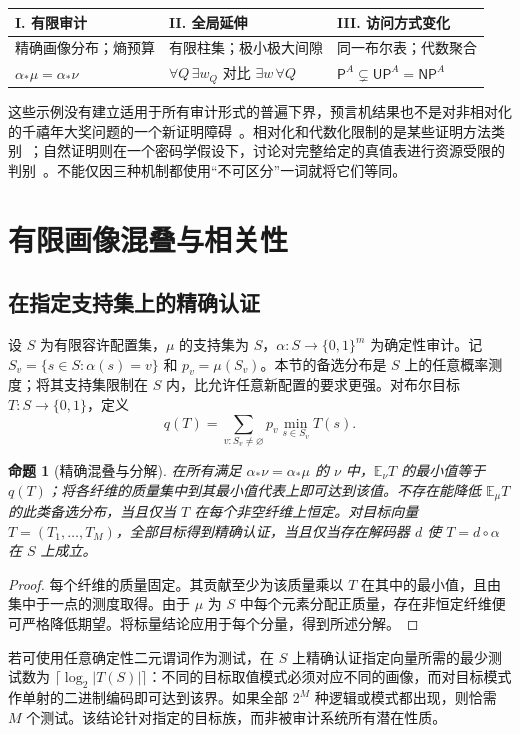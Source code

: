 \documentclass[11pt,a4paper]{article}
\newcommand{\bits}{\{0,1\}}
\newcommand{\PP}{\mathsf{P}}
\newcommand{\NP}{\mathsf{NP}}
\newcommand{\UP}{\mathsf{UP}}
\newtheorem{proposition}[theorem]{命题}
\begin{document}
\begin{center}
\small\setlength{\tabcolsep}{7pt}
\begin{tabularx}{\linewidth}{YYY}
\toprule
\textbf{I. 有限审计} & \textbf{II. 全局延伸} & \textbf{III. 访问方式变化}\\
\midrule
精确画像分布；熵预算 & 有限柱集；极小极大间隙 & 同一布尔表；代数聚合\\
$\alpha_*\mu=\alpha_*\nu$ & $\forall Q\,\exists w_Q$ 对比 $\exists w\,\forall Q$ & $\PP^A\subsetneq\UP^A=\NP^A$\\
\bottomrule
\end{tabularx}
\end{center}
\noindent 这些示例没有建立适用于所有审计形式的普遍下界，预言机结果也不是对非相对化的千禧年大奖问题的一个新证明障碍~\cite{cook}。相对化和代数化限制的是某些证明方法类别~\cite{bgs,aw}；自然证明则在一个密码学假设下，讨论对完整给定的真值表进行资源受限的判别~\cite{rr}。不能仅因三种机制都使用“不可区分”一词就将它们等同。

\section{有限画像混叠与相关性}
\subsection{在指定支持集上的精确认证}
设 $S$ 为有限容许配置集，$\mu$ 的支持集为 $S$，$\alpha:S\to\bits^m$ 为确定性审计。记 $S_v=\{s\in S:\alpha(s)=v\}$ 和 $p_v=\mu(S_v)$。本节的备选分布是 $S$ 上的任意概率测度；将其支持集限制在 $S$ 内，比允许任意新配置的要求更强。对布尔目标 $T:S\to\bits$，定义
\[
q(T)=\sum_{v:S_v\ne\varnothing}p_v\min_{s\in S_v}T(s).
\]
\begin{proposition}[精确混叠与分解]\label{prop:alias}
在所有满足 $\alpha_*\nu=\alpha_*\mu$ 的 $\nu$ 中，$\mathbb E_\nu T$ 的最小值等于 $q(T)$；将各纤维的质量集中到其最小值代表上即可达到该值。不存在能降低 $\mathbb E_\mu T$ 的此类备选分布，当且仅当 $T$ 在每个非空纤维上恒定。对目标向量 $T=(T_1,\ldots,T_M)$，全部目标得到精确认证，当且仅当存在解码器 $d$ 使 $T=d\circ\alpha$ 在 $S$ 上成立。
\end{proposition}
\begin{proof}
每个纤维的质量固定。其贡献至少为该质量乘以 $T$ 在其中的最小值，且由集中于一点的测度取得。由于 $\mu$ 为 $S$ 中每个元素分配正质量，存在非恒定纤维便可严格降低期望。将标量结论应用于每个分量，得到所述分解。
\end{proof}
若可使用任意确定性二元谓词作为测试，在 $S$ 上精确认证指定向量所需的最少测试数为 $\lceil\log_2|T(S)|\rceil$：不同的目标取值模式必须对应不同的画像，而对目标模式作单射的二进制编码即可达到该界。如果全部 $2^M$ 种逻辑或模式都出现，则恰需 $M$ 个测试。该结论针对指定的目标族，而非被审计系统所有潜在性质。
\end{document}

